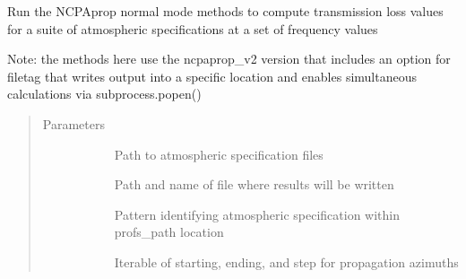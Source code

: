 \documentclass[letterpaper,10pt,english]{sphinxmanual}
\begin{document}
\begin{fulllineitems}
\label{\detokenize{stochprop.propagation:stochprop.propagation.run_modess}}
\sphinxAtStartPar
Run the NCPAprop normal mode methods to compute transmission
loss values for a suite of atmospheric specifications at
a set of frequency values

\sphinxAtStartPar
Note: the methods here use the ncpaprop\_v2 version that includes an option
for \textendash{}filetag that writes output into a specific location and enables
simultaneous calculations via subprocess.popen()
\begin{quote}\begin{description}
\item[{Parameters}] \leavevmode\begin{description}
\item[{}] \leavevmode
\sphinxAtStartPar
Path to atmospheric specification files

\item[{}] \leavevmode
\sphinxAtStartPar
Path and name of file where results will be written

\item[{}] \leavevmode
\sphinxAtStartPar
Pattern identifying atmospheric specification within profs\_path location

\item[{}] \leavevmode
\sphinxAtStartPar
Iterable of starting, ending, and step for propagation azimuths


\end{description}
\end{description}
\end{quote}
\end{fulllineitems}
\end{document}
